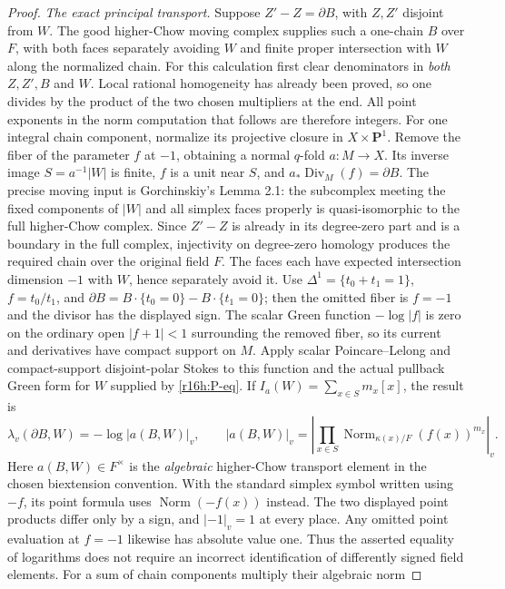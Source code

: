 \documentclass[11pt,a4paper]{article}
\theoremstyle{definition}
\theoremstyle{remark}
\numberwithin{equation}{section}
\begin{document}
\begin{proof}
\emph{The exact principal transport.}
Suppose $Z'-Z=\partial B$, with $Z,Z'$ disjoint from $W$. The good
higher-Chow moving complex supplies such a one-chain $B$ over $F$,
with both faces separately
avoiding $W$ and finite proper intersection with $W$ along the
normalized chain. For this calculation first clear denominators in
\emph{both} $Z,Z',B$ and $W$. Local rational homogeneity has already
been proved, so one divides by the product of the two chosen
multipliers at the end. All point exponents in the norm computation
that follows are therefore integers. For one integral chain component, normalize its
projective closure in $X\times\mathbf P^1$. Remove the fiber of
the parameter $f$ at $-1$, obtaining a normal $q$-fold $a:M\to X$.
Its inverse image $S=a^{-1}|W|$ is finite, $f$ is a unit near $S$,
and $a_*\operatorname{Div}_M(f)=\partial B$. The precise moving
input is Gorchinskiy's Lemma 2.1: the subcomplex meeting the fixed
components of $|W|$ and all simplex faces properly is
quasi-isomorphic to the full higher-Chow complex. Since $Z'-Z$ is
already in its degree-zero part and is a boundary in the full
complex, injectivity on degree-zero homology produces the required
chain over the original field $F$. The faces each have expected
intersection dimension $-1$ with $W$, hence separately avoid it.
Use $\Delta^1=\{t_0+t_1=1\}$, $f=t_0/t_1$, and
$\partial B=B\cdot\{t_0=0\}-B\cdot\{t_1=0\}$; then the omitted
fiber is $f=-1$ and the divisor has the displayed sign.
The scalar Green function $-\log|f|$ is zero on the ordinary open
$|f+1|<1$ surrounding the removed fiber, so its current and
derivatives have compact support on $M$. Apply scalar
Poincare--Lelong and compact-support disjoint-polar Stokes to this
function and the actual pullback Green form for $W$ supplied by
\eqref{r16h:P-eq}. If
$I_a(W)=\sum_{x\in S}m_x[x]$, the result is
\[
 \lambda_v(\partial B,W)
       =-\log|a(B,W)|_v,\qquad
 |a(B,W)|_v=
 \left|\prod_{x\in S}\operatorname{Norm}_{\kappa(x)/F}(f(x))^{m_x}\right|_v.
 \tag{H16.12}\label{r16h:principal}
\]
Here $a(B,W)\in F^\times$ is the \emph{algebraic} higher-Chow
transport element in the chosen biextension convention. With the
standard simplex symbol written using $-f$, its point formula uses
$\operatorname{Norm}(-f(x))$ instead. The two displayed point products
differ only by a sign, and $|-1|_v=1$ at every place. Any omitted
point evaluation at $f=-1$ likewise has absolute value one.
Thus the asserted equality of logarithms does not require an
incorrect identification of differently signed field elements.
For a sum of chain components multiply their algebraic norm

\end{proof}
\end{document}
